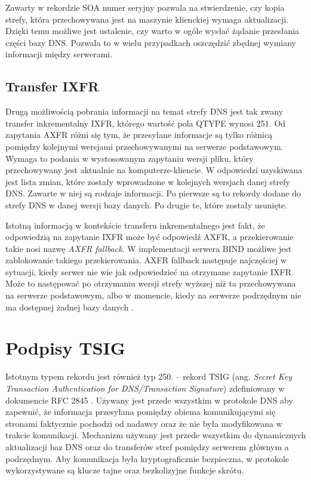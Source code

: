 Zawarty w rekordzie SOA numer seryjny pozwala na stwierdzenie, czy kopia strefy, która przechowywana jest na maszynie klienckiej
wymaga aktualizacji. Dzięki temu możliwe jest ustalenie, czy warto w ogóle wysłać żądanie przesłania części bazy DNS. Pozwala to
w wielu przypadkach oszczędzić zbędnej wymiany informacji między serwerami.

\subsection{Transfer IXFR}
Drugą możliwością pobrania informacji na temat strefy DNS jest tak zwany transfer inkrementalny IXFR, którego wartość pola QTYPE
wynosi 251. Od zapytania AXFR różni się tym, że przesyłane informacje są tylko różnicą pomiędzy kolejnymi wersjami przechowywanymi
na serwerze podstawowym. Wymaga to podania w wystosowanym zapytaniu wersji pliku, który przechowywany jest aktualnie na
komputerze-kliencie. W odpowiedzi uzyskiwana jest lista zmian, które zostały wprowadzone w kolejnych wersjach danej strefy DNS.
Zawarte w niej są rodzaje informacji. Po pierwsze są to rekordy dodane do strefy DNS w danej wersji bazy danych.
Po drugie te, które zostały usunięte.

Istotną informacją w kontekście transferu inkrementalnego jest fakt, że odpowiedzią na zapytanie IXFR może być odpowiedź AXFR, a
przekierowanie takie nosi nazwę \textit{AXFR fallback}. W implementacji serwera BIND \cite{isc} możliwe jest zablokowanie takiego
przekierowania. AXFR fallback następuje najczęściej w sytuacji, kiedy serwer nie wie jak odpowiedzieć na otrzymane zapytanie IXFR.
Może to następować po otrzymaniu wersji strefy wyższej niż ta przechowywana na serwerze podstawowym, albo w momencie, kiedy na
serwerze podrzędnym nie ma dostępnej żadnej bazy danych \cite{I-D.song-dnsop-ixfr-fallback}.


\section{Podpisy TSIG}
\label{TSIG}
Istotnym typem rekordu jest również typ 250. -- rekord TSIG (ang. \textit{Secret Key Transaction Authentication for DNS/Transaction
Signature}) zdefiniowany w dokumencie RFC 2845 \cite{RFC2845}. Używany jest przede wszystkim w protokole DNS aby zapewnić, że
informacja przesyłana pomiędzy obiema komunikującymi się stronami faktycznie pochodzi od nadawcy oraz że nie była modyfikowana w
trakcie komunikacji. Mechanizm używany jest przede wszystkim do dynamicznych aktualizacji baz DNS oraz do transferów stref pomiędzy
serwerem głównym a podrzędnym. Aby komunikacja była kryptograficznie bezpieczna, w protokole wykorzystywane są klucze tajne oraz
bezkolizyjne funkcje skrótu.

